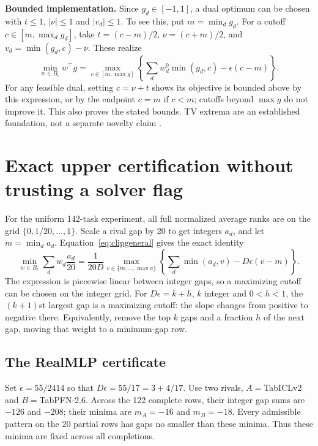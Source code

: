 \documentclass[11pt,a4paper]{article}
\begin{document}
\textbf{Bounded implementation.} Since $g_d\in[-1,1]$, a dual optimum can be
chosen with $t\leq1$, $|\nu|\leq1$ and $|v_d|\leq1$. To see this, put
$m=\min_d g_d$. For a cutoff $c\in[m,\max_d g_d]$, take
$t=(c-m)/2$, $\nu=(c+m)/2$, and $v_d=\min(g_d,c)-\nu$. These realize
\begin{equation}\label{eq:clipgeneral}
\min_{w\in B_\epsilon}w^\top g
=\max_{c\in[m,\max g]}\left\{\sum_d w_d^0\min(g_d,c)-\epsilon(c-m)\right\}.
\end{equation}
For any feasible dual, setting $c=\nu+t$ shows its objective is bounded above by
this expression, or by the endpoint $c=m$ if $c<m$; cutoffs beyond $\max g$ do not
improve it. This also proves the stated bounds. TV extrema are an established
foundation, not a separate novelty claim \cite{tv}.

\newpage
\section{Exact upper certification without trusting a solver flag}
For the uniform 142-task experiment, all full normalized average ranks are on
the grid $\{0,1/20,\ldots,1\}$. Scale a rival gap by 20 to get integers $a_d$,
and let $m=\min_d a_d$. Equation~\eqref{eq:clipgeneral} gives the exact identity
\begin{equation}\label{eq:clipint}
\min_{w\in B_\epsilon}\sum_d w_d\frac{a_d}{20}
=\frac{1}{20D}\max_{v\in\{m,\ldots,\max a\}}
\left\{\sum_d\min(a_d,v)-D\epsilon(v-m)\right\}.
\end{equation}
The expression is piecewise linear between integer gaps, so a maximizing cutoff
can be chosen on the integer grid. For $D\epsilon=k+h$, $k$ integer and
$0<h<1$, the $(k+1)$st largest gap is a maximizing cutoff: the slope changes
from positive to negative there. Equivalently, remove the top $k$ gaps and a
fraction $h$ of the next gap, moving that weight to a minimum-gap row.

\subsection*{The RealMLP certificate}
Set $\epsilon=55/2414$ so that $D\epsilon=55/17=3+4/17$. Use two rivals,
$A=$TabICLv2 and $B=$TabPFN-2.6. Across the 122 complete rows, their integer gap
sums are $-126$ and $-208$; their minima are $m_A=-16$ and $m_B=-18$.
Every admissible pattern on the 20 partial rows has gaps no smaller than these
minima. Thus these minima are fixed across all completions.
\end{document}
